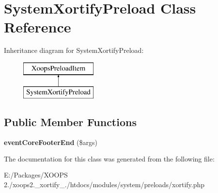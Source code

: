 \hypertarget{class_system_xortify_preload}{\section{System\-Xortify\-Preload Class Reference}
\label{class_system_xortify_preload}
}
Inheritance diagram for System\-Xortify\-Preload\-:\begin{figure}[H]
\begin{center}
\leavevmode
\includegraphics[height=2.000000cm]{class_system_xortify_preload}
\end{center}
\end{figure}
\subsection*{Public Member Functions}
\begin{DoxyCompactItemize}
\item 
\hypertarget{class_system_xortify_preload_ab6ecc671248b7ce7ae612524ff5cf752}{{\bfseries event\-Core\-Footer\-End} (\$args)}\label{class_system_xortify_preload_ab6ecc671248b7ce7ae612524ff5cf752}

\end{DoxyCompactItemize}


The documentation for this class was generated from the following file\-:\begin{DoxyCompactItemize}
\item 
E\-:/\-Packages/\-X\-O\-O\-P\-S 2./xoops2.\-\_\-xortify\-\_./htdocs/modules/system/preloads/xortify.\-php\end{DoxyCompactItemize}
